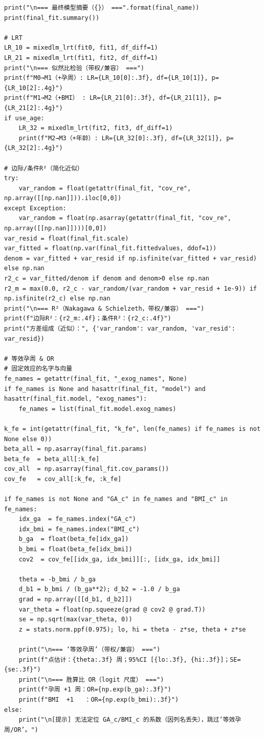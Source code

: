 \begin{lstlisting}
print("\n=== 最终模型摘要（{}） ===".format(final_name))
print(final_fit.summary())

# LRT
LR_10 = mixedlm_lrt(fit0, fit1, df_diff=1)
LR_21 = mixedlm_lrt(fit1, fit2, df_diff=1)
print("\n=== 似然比检验（带权/兼容） ===")
print(f"M0→M1（+孕周）: LR={LR_10[0]:.3f}, df={LR_10[1]}, p={LR_10[2]:.4g}")
print(f"M1→M2（+BMI） : LR={LR_21[0]:.3f}, df={LR_21[1]}, p={LR_21[2]:.4g}")
if use_age:
    LR_32 = mixedlm_lrt(fit2, fit3, df_diff=1)
    print(f"M2→M3（+年龄）: LR={LR_32[0]:.3f}, df={LR_32[1]}, p={LR_32[2]:.4g}")

# 边际/条件R²（简化近似）
try:
    var_random = float(getattr(final_fit, "cov_re", np.array([[np.nan]])).iloc[0,0])
except Exception:
    var_random = float(np.asarray(getattr(final_fit, "cov_re", np.array([[np.nan]])))[0,0])
var_resid = float(final_fit.scale)
var_fitted = float(np.var(final_fit.fittedvalues, ddof=1))
denom = var_fitted + var_resid if np.isfinite(var_fitted + var_resid) else np.nan
r2_c = var_fitted/denom if denom and denom>0 else np.nan
r2_m = max(0.0, r2_c - var_random/(var_random + var_resid + 1e-9)) if np.isfinite(r2_c) else np.nan
print("\n=== R²（Nakagawa & Schielzeth，带权/兼容） ===")
print(f"边际R²：{r2_m:.4f}；条件R²：{r2_c:.4f}")
print("方差组成（近似）：", {'var_random': var_random, 'var_resid': var_resid})

# 等效孕周 & OR 
# 固定效应的名字与向量
fe_names = getattr(final_fit, "_exog_names", None)
if fe_names is None and hasattr(final_fit, "model") and hasattr(final_fit.model, "exog_names"):
    fe_names = list(final_fit.model.exog_names)

k_fe = int(getattr(final_fit, "k_fe", len(fe_names) if fe_names is not None else 0))
beta_all = np.asarray(final_fit.params)
beta_fe  = beta_all[:k_fe]                      
cov_all  = np.asarray(final_fit.cov_params())
cov_fe   = cov_all[:k_fe, :k_fe]                 

if fe_names is not None and "GA_c" in fe_names and "BMI_c" in fe_names:
    idx_ga  = fe_names.index("GA_c")
    idx_bmi = fe_names.index("BMI_c")
    b_ga  = float(beta_fe[idx_ga])
    b_bmi = float(beta_fe[idx_bmi])
    cov2  = cov_fe[[idx_ga, idx_bmi]][:, [idx_ga, idx_bmi]]

    theta = -b_bmi / b_ga
    d_b1 = b_bmi / (b_ga**2); d_b2 = -1.0 / b_ga
    grad = np.array([[d_b1, d_b2]])
    var_theta = float(np.squeeze(grad @ cov2 @ grad.T))
    se = np.sqrt(max(var_theta, 0))
    z = stats.norm.ppf(0.975); lo, hi = theta - z*se, theta + z*se

    print("\n=== ‘等效孕周’（带权/兼容） ===")
    print(f"点估计：{theta:.3f} 周；95%CI [{lo:.3f}, {hi:.3f}]；SE={se:.3f}")
    print("\n=== 胜算比 OR（logit 尺度） ===")
    print(f"孕周 +1 周：OR={np.exp(b_ga):.3f}")
    print(f"BMI  +1   ：OR={np.exp(b_bmi):.3f}")
else:
    print("\n[提示] 无法定位 GA_c/BMI_c 的系数（因列名丢失），跳过‘等效孕周/OR’。")


\end{lstlisting}
